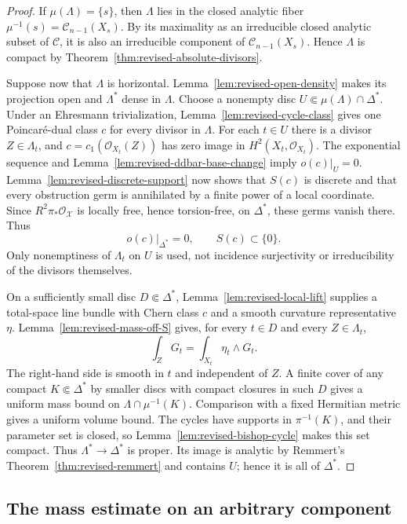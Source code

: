 \documentclass[11pt]{amsart}
\numberwithin{equation}{section}
\theoremstyle{plain}
\theoremstyle{definition}
\newcommand{\cC}{\mathcal C}
\newcommand{\cO}{\mathcal O}
\newcommand{\cX}{\mathcal X}
\begin{document}
\begin{proof}
If $\mu(\Lambda)=\{s\}$, then $\Lambda$ lies in the closed analytic
fiber $\mu^{-1}(s)=\cC_{n-1}(X_s)$.  By its maximality as an
irreducible closed analytic subset of $\mathscr C$, it is also an
irreducible component of $\cC_{n-1}(X_s)$.  Hence $\Lambda$ is compact
by Theorem~\ref{thm:revised-absolute-divisors}.

Suppose now that $\Lambda$ is horizontal.  Lemma~\ref{lem:revised-open-density}
makes its projection open and $\Lambda^*$ dense in $\Lambda$.
Choose a nonempty disc $U\Subset\mu(\Lambda)\cap\Delta^*$.
Under an Ehresmann trivialization, Lemma~\ref{lem:revised-cycle-class} gives
one Poincar\'e-dual class $c$ for every divisor in $\Lambda$.
For each $t\in U$ there is a divisor $Z\in\Lambda_t$, and
$c=c_1(\cO_{X_t}(Z))$ has zero image in $H^2(X_t,\cO_{X_t})$.
The exponential sequence and Lemma~\ref{lem:revised-ddbar-base-change} imply
$o(c)|_U=0$.  Lemma~\ref{lem:revised-discrete-support} now shows that
$S(c)$ is discrete and that every obstruction germ is annihilated by
a finite power of a local coordinate.  Since $R^2\pi_*\cO_{\cX}$ is
locally free, hence torsion-free, on $\Delta^*$, these germs vanish
there.  Thus
\[
 o(c)|_{\Delta^*}=0,\qquad S(c)\subset\{0\}.
\]
Only nonemptiness of $\Lambda_t$ on $U$ is used, not incidence
surjectivity or irreducibility of the divisors themselves.

On a sufficiently small disc $D\Subset\Delta^*$,
Lemma~\ref{lem:revised-local-lift} supplies a total-space line bundle with
Chern class $c$ and a smooth curvature representative $\eta$.
Lemma~\ref{lem:revised-mass-off-S} gives, for every $t\in D$ and
every $Z\in\Lambda_t$,
\[
 \int_ZG_t=\int_{X_t}\eta_t\wedge G_t.
\]
The right-hand side is smooth
in $t$ and independent of $Z$.  A finite cover of any compact
$K\Subset\Delta^*$ by smaller discs with compact closures in such
$D$ gives a uniform mass bound on $\Lambda\cap\mu^{-1}(K)$.
Comparison with a fixed Hermitian metric gives a uniform volume bound.
The cycles have supports in $\pi^{-1}(K)$, and their parameter set is
closed, so Lemma~\ref{lem:revised-bishop-cycle} makes this set compact.
Thus $\Lambda^*\to\Delta^*$ is proper.  Its image is analytic by
Remmert's Theorem~\ref{thm:revised-remmert} and contains $U$;
hence it is all of $\Delta^*$.
\end{proof}

\subsection{The mass estimate on an arbitrary component}
\label{ss:componentwise-mass}
\end{document}
